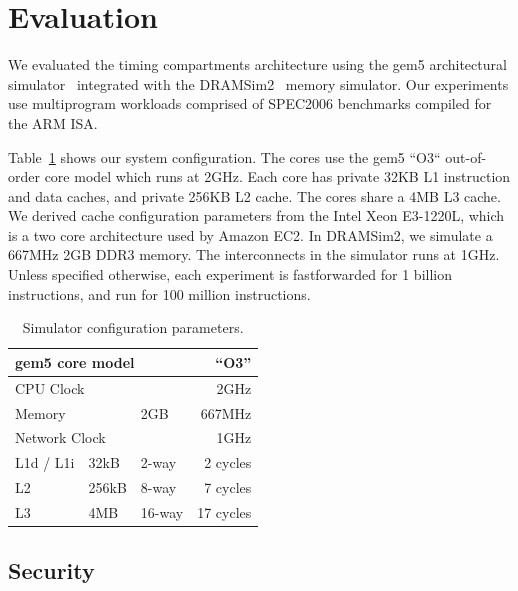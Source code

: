\section{Evaluation}

We evaluated the timing compartments architecture using the gem5 architectural 
simulator~\cite{gem5} integrated with the DRAMSim2~\cite{DRAMSim2} memory 
simulator. Our experiments use multiprogram workloads comprised of SPEC2006 
benchmarks compiled for the ARM ISA. 

Table~\ref{tab:config} shows our system configuration.
The cores use the gem5 ``O3`` out-of-order core model which runs at 2GHz.  Each 
core has private 32KB L1 instruction and data caches, and private 256KB L2 
cache. The cores share a 4MB L3 cache. We derived cache configuration 
parameters from the Intel Xeon E3-1220L, which is a two core architecture used 
by Amazon EC2. In DRAMSim2, we simulate a 667MHz 2GB DDR3 memory. The 
interconnects in the simulator runs at 1GHz. Unless specified otherwise, each 
experiment is fastforwarded for 1 billion instructions, and run for 100 million 
instructions. 


\begin{table}
    \caption{Simulator configuration parameters.}
    \centering
\begin{small}
    \begin{tabular}{|l|l|l|r|}
        \hline
        \multicolumn{3}{|l|}{gem5 core model} & ``O3''        \\\hline
        \multicolumn{3}{|l|}{CPU Clock}    & 2GHz             \\\hline
        \hline
        \multicolumn{2}{|l|}{Memory}             & 2GB    & 667MHz  \\\hline
        \hline
        \multicolumn{3}{|l|}{Network Clock}      & 1GHz \\\hline
        \hline
        L1d / L1i  & 32kB   & 2-way  & 2 cycles\\\hline
        L2         & 256kB  & 8-way  & 7 cycles \\\hline
        L3         & 4MB    & 16-way & 17 cycles  \\\hline
    \end{tabular}
    \end{small}
    \label{tab:config}
\end{table}

\subsection{Security}


